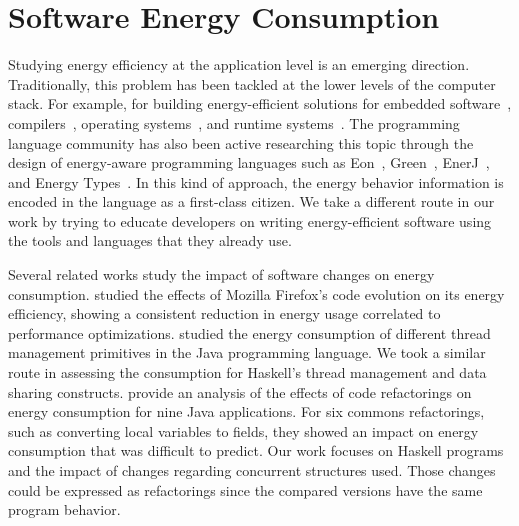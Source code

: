 \section{Software Energy Consumption}
Studying energy efficiency at the application level is an emerging direction. Traditionally, this problem has been tackled at the lower levels of the computer stack. For example, for building energy-efficient solutions for embedded software~\cite{tiwari:1994}, compilers~\cite{hsu:2003}, operating systems~\cite{merkel:2006}, and runtime systems~\cite{ribic:2014, farkas:2000}. The programming language community has also been active researching this topic through the design of energy-aware programming languages such as Eon~\cite{sorber:2007}, Green~\cite{baek:2010}, EnerJ~\cite{sampson:2011}, and Energy Types~\cite{cohen:2012}. In this kind of approach, the energy behavior information is encoded in the language as a first-class citizen. We take a different route in our work by trying to educate developers on writing energy-efficient software using the tools and languages that they already use.

Several related works study the impact of software changes on energy consumption.  studied the effects of Mozilla Firefox's code evolution on its energy efficiency, showing a consistent reduction in energy usage correlated to performance optimizations.  studied the energy consumption of different thread management primitives in the Java programming language. We took a similar route in assessing the consumption for Haskell's thread management and data sharing constructs.  provide an analysis of the effects of code refactorings on energy consumption for nine Java applications. For six commons refactorings, such as converting local variables to fields, they showed an impact on energy consumption that was difficult to predict. Our work focuses on Haskell programs and the impact of changes regarding concurrent structures used. Those changes could be expressed as refactorings since the compared versions have the same program behavior.

